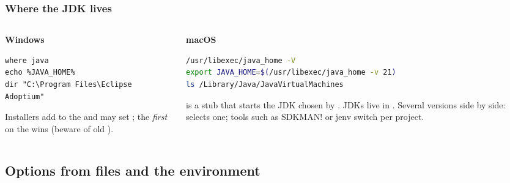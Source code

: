 \documentclass[aspectratio=169,10pt,compress]{beamer}
\newcommand{\win}{\textbf{Windows}}
\newcommand{\mac}{\textbf{macOS}}
\begin{document}
\begin{frame}[t,fragile] \frametitle{Where the JDK lives}
  \begin{columns}[T]
    \begin{column}{0.48\textwidth}
      \begin{block}{\win}


\begin{lstlisting}[style=codesnippet, language={}, basicstyle=\ttfamily\scriptsize]
where java
echo %JAVA_HOME%
dir "C:\Program Files\Eclipse Adoptium"
\end{lstlisting}


      \end{block}
      \small Installers add  to the  and may set ; the \emph{first} 
      on the  wins (beware of old ).
    \end{column}
    \begin{column}{0.48\textwidth}
      \begin{block}{\mac}


\begin{lstlisting}[style=codesnippet, language=bash, basicstyle=\ttfamily\scriptsize]
/usr/libexec/java_home -V
export JAVA_HOME=$(/usr/libexec/java_home -v 21)
ls /Library/Java/JavaVirtualMachines
\end{lstlisting}


      \end{block}
      \small {} is a stub that starts the JDK chosen by .
      JDKs live in . Several versions side by side:  selects one;
      tools such as SDKMAN! or jenv switch per project.
    \end{column}
  \end{columns}
\end{frame}

\subsection[Options]{Options from files and the environment}
\end{document}
